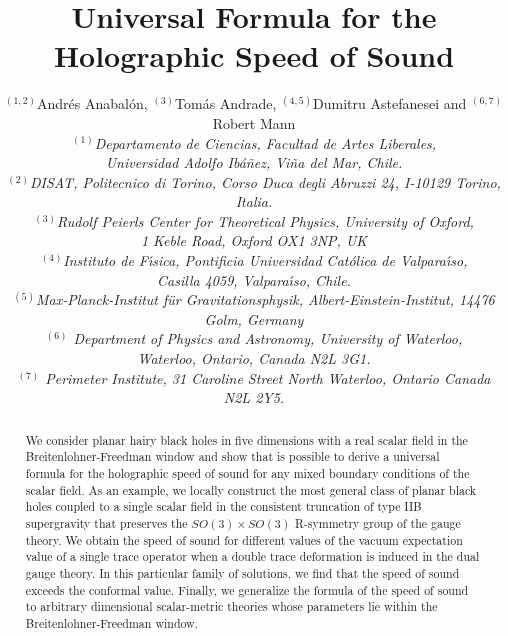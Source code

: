 \documentclass[11pt,epsf,letterpaper]{article}%
\begin{document}
\title{Universal Formula for the Holographic Speed of Sound}
\author{$^{(1,2)}$Andr\'{e}s Anabal\'{o}n, $^{(3)}$Tom\'{a}s Andrade, $^{(4,5)}%
$Dumitru Astefanesei and $^{(6,7)}$Robert Mann\\\textit{$^{(1)}$Departamento de Ciencias, Facultad de Artes Liberales,}\\\textit{Universidad Adolfo Ib\'{a}\~{n}ez, Vi\~{n}a del Mar, Chile.} \\\textit{$^{(2)}$DISAT, Politecnico di Torino, Corso Duca degli Abruzzi 24,
I-10129 Torino, Italia.} \\\textit{$^{(3)}$Rudolf Peierls Center for Theoretical Physics, University of
Oxford,}\\\textit{1 Keble Road, Oxford OX1 3NP, UK} \\\textit{$^{(4)}$Instituto de F\'\i sica, Pontificia Universidad Cat\'olica de
Valpara\'\i so,} \\\textit{ Casilla 4059, Valpara\'{\i}so, Chile.}\\\textit{$^{(5)}$Max-Planck-Institut f\"ur Gravitationsphysik,
Albert-Einstein-Institut, 14476 Golm, Germany}\\\textit{$^{(6)}$ Department of Physics and Astronomy, University of Waterloo,}\\\textit{Waterloo, Ontario, Canada N2L 3G1.}\\\textit{$^{(7)}$ Perimeter Institute, 31 Caroline Street North Waterloo,
Ontario Canada N2L 2Y5.}}
\maketitle

\begin{abstract}
We consider planar hairy black holes in five dimensions with a real scalar
field in the Breitenlohner-Freedman window and show that is possible to derive
a universal formula for the holographic speed of sound for any mixed boundary
conditions of the scalar field. As an example, we locally construct the most
general class of planar black holes coupled to a single scalar field in the
consistent truncation of type IIB supergravity that preserves the $SO(3)\times
SO(3)$ R-symmetry group of the gauge theory. We obtain the speed of sound for
different values of the vacuum expectation value of a single trace operator
when a double trace deformation is induced in the dual gauge theory. In this
particular family of solutions, we find that the speed of sound exceeds the
conformal value. Finally, we generalize the formula of the speed of sound to
arbitrary dimensional scalar-metric theories whose parameters lie within the
Breitenlohner-Freedman window.

\end{abstract}
\end{document}

